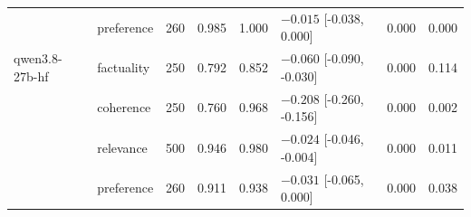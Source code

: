 \begin{table}[t]
\begin{tabular}{llrrrlrr}
 & preference & 260 & 0.985 & 1.000 & $-0.015$ [-0.038, 0.000] & 0.000 & 0.000 \\
\addlinespace
qwen3.8-27b-hf & factuality & 250 & 0.792 & 0.852 & $-0.060$ [-0.090, -0.030] & 0.000 & 0.114 \\
 & coherence & 250 & 0.760 & 0.968 & $-0.208$ [-0.260, -0.156] & 0.000 & 0.002 \\
 & relevance & 500 & 0.946 & 0.980 & $-0.024$ [-0.046, -0.004] & 0.000 & 0.011 \\
 & preference & 260 & 0.911 & 0.938 & $-0.031$ [-0.065, 0.000] & 0.000 & 0.038 \\
\bottomrule
\end{tabular}
\end{table}
